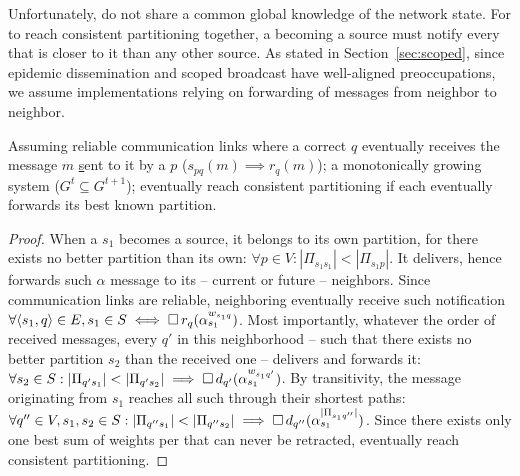 Unfortunately, \processes do not share a common global knowledge of
the network state. For \processes to reach consistent partitioning
together, a \process becoming a source must notify every \process that
is closer to it than any other source. As stated in
Section~\ref{sec:scoped}, since epidemic dissemination and scoped
broadcast have well-aligned preoccupations, we assume implementations
relying on forwarding of messages from neighbor to neighbor. 

\begin{theorem}
  Assuming reliable communication links where a correct \process $q$
  eventually receives the message $m$ \underline{s}ent to it by a
  \process $p$ ($s_{pq}(m) \implies r_{q}(m)$); a monotonically
  growing system ($G^t \subseteq G^{t+1}$); \processes eventually
  reach consistent partitioning if each \process eventually forwards
  its best known partition.
\end{theorem}

\begin{proof}
  When a \process $s_1$ becomes a source, it belongs to its own
  partition, for there exists no better partition than its own:
  $\forall p \in V: |\Pi_{s_1 s_1}| < |\Pi_{s_1 p}|$. It delivers,
  hence forwards such $\alpha$ message to its -- current or future --
  neighbors. Since communication links are reliable, neighboring
  \processes eventually receive such notification $\forall \langle
  s_1, q \rangle \in E, s_1 \in S \iff \square\,
  r_q(\alpha_{s_1}^{w_{s_1 q}})$. Most importantly, whatever the order
  of received messages, every \process $q'$ in this neighborhood --
  such that there exists no better partition $s_2$ than the received
  one -- delivers and forwards it: $\forall s_2 \in S: |\Pi_{q' s_1}|
  < |\Pi_{q' s_2}| \implies \square\, d_{q'}(\alpha_{s_1}^{w_{s_1
      q'}})$. By transitivity, the message originating from $s_1$
  reaches all such \processes through their shortest paths: $\forall
  q'' \in V, s_1, s_2 \in S: |\Pi_{q'' s_1}| < |\Pi_{q'' s_2}|
  \implies \square\, d_{q''}(\alpha_{s_1}^{|\Pi_{s_1 q''}|})$.
  Since there exists only one best sum of weights per \process that
  can never be retracted, \processes eventually reach consistent
  partitioning.
\end{proof}

